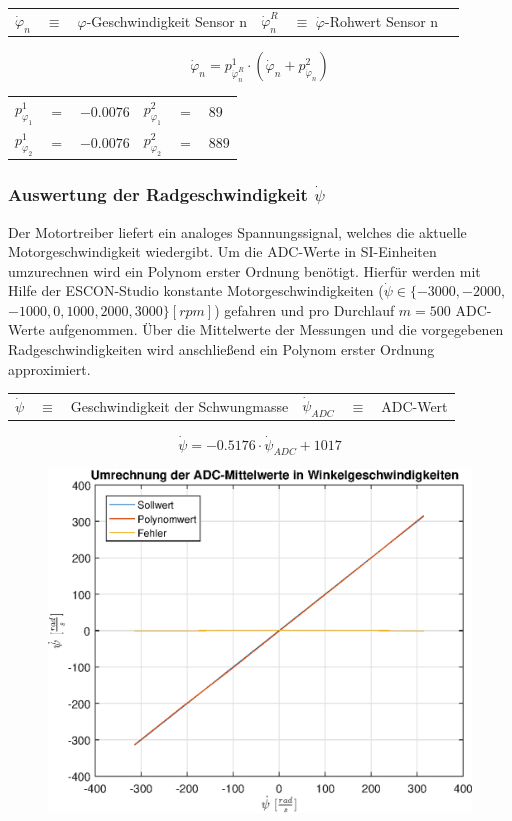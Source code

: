\begin{table}[h]
\centering
\begin{tabular}{lcllcl}
$\dot{\varphi}_n$ & $\equiv$ & $\varphi$-Geschwindigkeit Sensor n & $\dot{\varphi}^R_n$ & $\equiv$ $\dot{\varphi}$-Rohwert Sensor n
\end{tabular}
\end{table}

\begin{equation}
\dot{\varphi}_n = p^1_{\dot{\varphi}^R_n}  \cdot (\dot{\varphi}_n + p^2_{\dot{\varphi}_n})
\end{equation}

\begin{table}[h]
\centering
\begin{tabular}{lcllcl}
$p^1_{\varphi_1}$ &$=$& $-0.0076$ & $p^2_{\varphi_1}$ &$=$& $89$ \\
$p^1_{\varphi_2}$ &$=$& $-0.0076$ & $p^2_{\varphi_2}$ &$=$& $889$ \\
\end{tabular}
\end{table}

\subsubsection{Auswertung der Radgeschwindigkeit $\dot{\psi}$}
Der Motortreiber liefert ein analoges Spannungssignal, welches die aktuelle Motorgeschwindigkeit wiedergibt. Um die ADC-Werte in SI-Einheiten umzurechnen wird ein Polynom erster Ordnung benötigt. Hierfür werden mit Hilfe der ESCON-Studio konstante Motorgeschwindigkeiten ($\dot{\psi} \in \{ -3000, -2000,$  $-1000, 0, 1000, 2000, 3000 \} [rpm] $) gefahren und pro Durchlauf $m=500$ ADC-Werte aufgenommen. Über die Mittelwerte der Messungen und die vorgegebenen Radgeschwindigkeiten wird anschließend ein Polynom erster Ordnung approximiert.

\begin{table}[h!]
\centering
\begin{tabular}{lcllcl}
$\dot{\psi}$ & $\equiv$ & Geschwindigkeit der Schwungmasse & $\dot{\psi}_{ADC}$ & $\equiv$ & ADC-Wert
\end{tabular}
\end{table}

\begin{equation}
\dot{\psi} = -0.5176 \cdot \dot{\psi}_{ADC} + 1017
\end{equation}

\begin{figure}[h!]
\centering
	\includegraphics[width=0.5\linewidth]{img/ADC_mittelwert_polynom.eps}
\end{figure}

